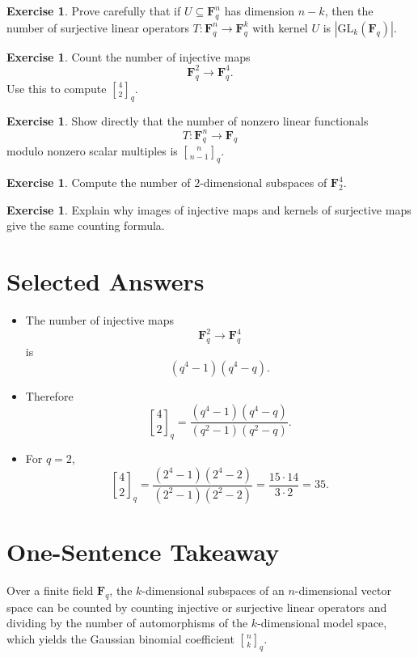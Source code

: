 \documentclass[11pt]{article}
\theoremstyle{definition}
\newtheorem{exercise}[theorem]{Exercise}
\theoremstyle{remark}
\newcommand{\F}{\mathbf{F}}
\newcommand{\GL}{\mathrm{GL}}
\newcommand{\qbinom}[2]{\genfrac{[}{]}{0pt}{}{#1}{#2}_q}
\begin{document}
	\begin{exercise}
		Prove carefully that if \(U\subseteq \F_q^n\) has dimension \(n-k\), then the number of surjective linear operators \(T:\F_q^n\to \F_q^k\) with kernel \(U\) is \(|\GL_k(\F_q)|\).
	\end{exercise}
	
	\begin{exercise}
		Count the number of injective maps
		\[
		\F_q^2\to \F_q^4.
		\]
		Use this to compute \(\qbinom{4}{2}\).
	\end{exercise}
	
	\begin{exercise}
		Show directly that the number of nonzero linear functionals
		\[
		T:\F_q^n\to \F_q
		\]
		modulo nonzero scalar multiples is \(\qbinom{n}{n-1}\).
	\end{exercise}
	
	\begin{exercise}
		Compute the number of \(2\)-dimensional subspaces of \(\F_2^4\).
	\end{exercise}
	
	\begin{exercise}
		Explain why images of injective maps and kernels of surjective maps give the same counting formula.
	\end{exercise}
	
	\section{Selected Answers}
	
	\begin{itemize}
		\item The number of injective maps
		\[
		\F_q^2\to \F_q^4
		\]
		is
		\[
		(q^4-1)(q^4-q).
		\]
		
		\item Therefore
		\[
		\qbinom{4}{2}
		=
		\frac{(q^4-1)(q^4-q)}{(q^2-1)(q^2-q)}.
		\]
		
		\item For \(q=2\),
		\[
		\qbinom{4}{2}
		=
		\frac{(2^4-1)(2^4-2)}{(2^2-1)(2^2-2)}
		=
		\frac{15\cdot 14}{3\cdot 2}
		=
		35.
		\]
	\end{itemize}
	
	\section*{One-Sentence Takeaway}
	
	Over a finite field \(\F_q\), the \(k\)-dimensional subspaces of an \(n\)-dimensional vector space can be counted by counting injective or surjective linear operators and dividing by the number of automorphisms of the \(k\)-dimensional model space, which yields the Gaussian binomial coefficient \(\qbinom{n}{k}\).
	
\end{document}
